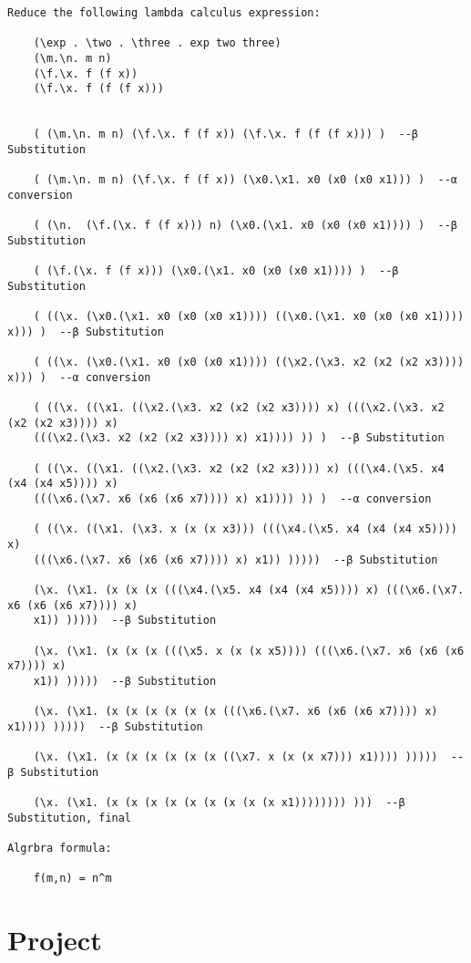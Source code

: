 \documentclass{article}
\theoremstyle{theorem}
\theoremstyle{definition}
\theoremstyle{remark}
\begin{document}
\begin{verbatim}
Reduce the following lambda calculus expression:

    (\exp . \two . \three . exp two three)
    (\m.\n. m n)
    (\f.\x. f (f x))
    (\f.\x. f (f (f x)))

 
    ( (\m.\n. m n) (\f.\x. f (f x)) (\f.\x. f (f (f x))) )  --β Substitution

    ( (\m.\n. m n) (\f.\x. f (f x)) (\x0.\x1. x0 (x0 (x0 x1))) )  --α conversion

    ( (\n.  (\f.(\x. f (f x))) n) (\x0.(\x1. x0 (x0 (x0 x1)))) )  --β Substitution

    ( (\f.(\x. f (f x))) (\x0.(\x1. x0 (x0 (x0 x1)))) )  --β Substitution

    ( ((\x. (\x0.(\x1. x0 (x0 (x0 x1)))) ((\x0.(\x1. x0 (x0 (x0 x1)))) x))) )  --β Substitution

    ( ((\x. (\x0.(\x1. x0 (x0 (x0 x1)))) ((\x2.(\x3. x2 (x2 (x2 x3)))) x))) )  --α conversion

    ( ((\x. ((\x1. ((\x2.(\x3. x2 (x2 (x2 x3)))) x) (((\x2.(\x3. x2 (x2 (x2 x3)))) x) 
    (((\x2.(\x3. x2 (x2 (x2 x3)))) x) x1)))) )) )  --β Substitution

    ( ((\x. ((\x1. ((\x2.(\x3. x2 (x2 (x2 x3)))) x) (((\x4.(\x5. x4 (x4 (x4 x5)))) x) 
    (((\x6.(\x7. x6 (x6 (x6 x7)))) x) x1)))) )) )  --α conversion

    ( ((\x. ((\x1. (\x3. x (x (x x3))) (((\x4.(\x5. x4 (x4 (x4 x5)))) x) 
    (((\x6.(\x7. x6 (x6 (x6 x7)))) x) x1)) )))))  --β Substitution

    (\x. (\x1. (x (x (x (((\x4.(\x5. x4 (x4 (x4 x5)))) x) (((\x6.(\x7. x6 (x6 (x6 x7)))) x) 
    x1)) )))))  --β Substitution

    (\x. (\x1. (x (x (x (((\x5. x (x (x x5)))) (((\x6.(\x7. x6 (x6 (x6 x7)))) x) 
    x1)) )))))  --β Substitution

    (\x. (\x1. (x (x (x (x (x (x (((\x6.(\x7. x6 (x6 (x6 x7)))) x) x1)))) )))))  --β Substitution

    (\x. (\x1. (x (x (x (x (x (x ((\x7. x (x (x x7))) x1)))) )))))  --β Substitution

    (\x. (\x1. (x (x (x (x (x (x (x (x (x x1)))))))) )))  --β Substitution, final

Algrbra formula:

    f(m,n) = n^m
\end{verbatim}




\section{Project}
\end{document}
